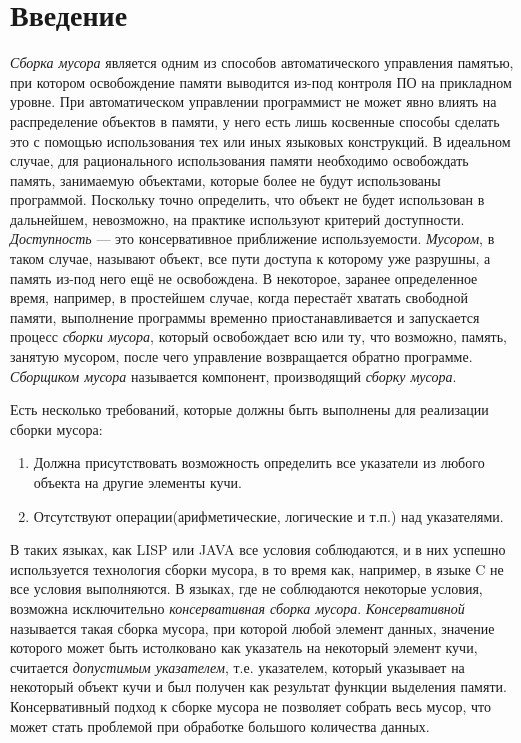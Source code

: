 \section*{Введение}
\emph{Сборка мусора} является одним из способов автоматического управления памятью, при котором освобождение памяти выводится из-под контроля ПО на прикладном уровне. При автоматическом управлении программист не может явно влиять на распределение объектов в памяти, у него есть лишь косвенные способы сделать это с помощью использования тех или иных языковых конструкций. В идеальном случае, для рационального использования памяти необходимо освобождать память, занимаемую объектами, которые более не будут использованы программой. Поскольку точно определить, что объект не будет использован в дальнейшем, невозможно, на практике используют критерий доступности. \emph{Доступность} --- это консервативное приближение используемости. \emph{Мусором}, в таком случае, называют объект, все пути доступа к которому уже разрушны, а память из-под него ещё не освобождена. В некоторое, заранее определенное время, например, в простейшем случае, когда перестаёт хватать свободной памяти, выполнение программы временно приостанавливается и запускается процесс \emph{сборки мусора}, который освобождает всю или ту, что возможно, память, занятую мусором, после чего управление возвращается обратно программе. \emph{Сборщиком мусора} называется компонент, производящий \emph{сборку мусора}.

Есть несколько требований, которые должны быть выполнены для реализации сборки мусора:
\begin{enumerate}
\item Должна присутствовать возможность определить все указатели из любого объекта на другие элементы кучи.
\item Отсутствуют операции(арифметические, логические и т.п.) над указателями.
\end{enumerate}
В таких языках, как LISP или JAVA все условия соблюдаются, и в них успешно используется технология сборки мусора, в то время как, например, в языке C не все условия выполняются. В языках, где не соблюдаются некоторые условия, возможна исключительно \emph{консервативная сборка мусора}. \emph{Консервативной} называется такая сборка мусора, при которой любой элемент данных, значение которого может быть истолковано как указатель на некоторый элемент кучи, считается  \emph{допустимым указателем}, т.е. указателем, который указывает на некоторый объект кучи и был получен как результат функции выделения памяти. Консервативный подход к сборке мусора не позволяет собрать весь мусор, что может стать проблемой при обработке большого количества данных.

